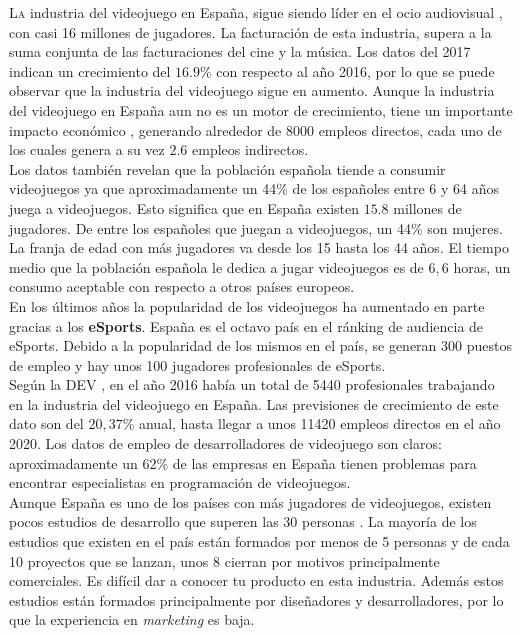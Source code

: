 \lettrine[lines=2,findent=2pt,nindent=3pt,loversize=0.1]{\textcolor[gray]{0.4}{L}}{a} industria del videojuego en España, sigue siendo líder en el ocio audiovisual \cite{1}, con casi 16 millones de jugadores. La facturación de esta industria, supera a la suma conjunta de las facturaciones del cine y la música. Los datos del 2017 indican un crecimiento del $16.9$\% con respecto al año 2016, por lo que se puede observar que la industria del videojuego sigue en aumento. Aunque la industria del videojuego en España aun no es un motor de crecimiento, tiene un importante impacto económico \cite{2}, generando alrededor de 8000 empleos directos, cada uno de los cuales genera a su vez $2.6$ empleos indirectos.\\


Los datos también revelan que la población española tiende a consumir videojuegos ya que aproximadamente un 44\% de los españoles entre 6 y 64 años juega a videojuegos. Esto significa que en España existen $15.8$ millones de jugadores. De entre los españoles que juegan a videojuegos, un 44\% son mujeres. La franja de edad con más jugadores va desde los 15 hasta los 44 años. El tiempo medio que la población española le dedica a jugar videojuegos es de $6,6$ horas, un consumo aceptable con respecto a otros países europeos.\\


En los últimos años la popularidad de los videojuegos ha aumentado en parte gracias a los \textbf{eSports}. España es el octavo país en el ránking de audiencia de eSports. Debido a la popularidad de los mismos en el país, se generan 300 puestos de empleo y hay unos 100 jugadores profesionales de eSports.\\


Según la \acf{DEV} \cite{3}, en el año 2016 había un total de 5440 profesionales trabajando en la industria del videojuego en España. Las previsiones de crecimiento de este dato son del $20,37$\% anual, hasta llegar a unos 11420 empleos directos en el año 2020. Los datos de empleo de desarrolladores de videojuego son claros: aproximadamente un 62\% de las empresas en España tienen problemas para encontrar especialistas en programación de videojuegos. \\


Aunque España es uno de los países con más jugadores de videojuegos, existen pocos estudios de desarrollo que superen las 30 personas \cite{4}. La mayoría de los estudios que existen en el país están formados por menos de 5 personas y de cada 10 proyectos que se lanzan, unos 8 cierran por motivos principalmente comerciales. Es difícil dar a conocer tu producto en esta industria. Además estos estudios están formados principalmente por diseñadores y desarrolladores, por lo que la experiencia en \textit{marketing} es baja.\\


